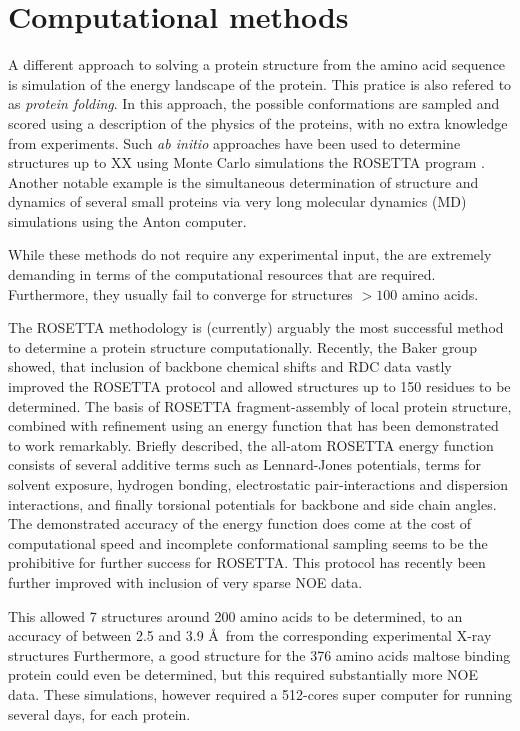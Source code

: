 \section{Computational methods}
A different approach to solving a protein structure from the amino acid sequence is simulation of the energy landscape of the protein.
This pratice is also refered to as \textit{protein folding}.
In this approach, the possible conformations are sampled and scored using a description of the physics of the proteins, with no extra knowledge from experiments.
Such \textit{ab initio} approaches have been used to determine structures up to XX using Monte Carlo simulations the ROSETTA program \cite{Baker2010}.
Another notable example is the simultaneous determination of structure and dynamics of several small proteins via very long molecular dynamics (MD) simulations using the Anton computer\cite{rdcensemble}.

While these methods do not require any experimental input, the are extremely demanding in terms of the computational resources that are required.
Furthermore, they usually fail to converge for structures $>100$ amino acids\cite{Lange2012}.

The ROSETTA methodology is (currently) arguably the most successful method to determine a protein structure computationally.
Recently, the Baker group showed, that inclusion of backbone chemical shifts and RDC data vastly improved the ROSETTA protocol and allowed structures up to 150 residues to be determined\cite{Baker2010,Lange2012}.
The basis of ROSETTA fragment-assembly of local protein structure, combined with  refinement using an energy function that has been demonstrated to work remarkably.
Briefly described, the all-atom ROSETTA energy function consists of several additive terms such as Lennard-Jones potentials, terms for solvent exposure, hydrogen bonding, electrostatic pair-interactions and dispersion interactions, and finally torsional potentials for backbone and side chain angles.
The demonstrated accuracy of the energy function does come at the cost of computational speed and incomplete conformational sampling seems to be the prohibitive for further success for ROSETTA.
This protocol has recently been further improved with inclusion of very sparse NOE data\cite{LangePNAS2012}.

This allowed 7 structures around 200 amino acids to be determined, to an accuracy of between 2.5 and 3.9 \AA~from the corresponding experimental X-ray structures
Furthermore, a good structure for the 376 amino acids maltose binding protein could even be determined, but this required substantially more NOE data.
These simulations, however required a 512-cores super computer for running several days, for each protein.

